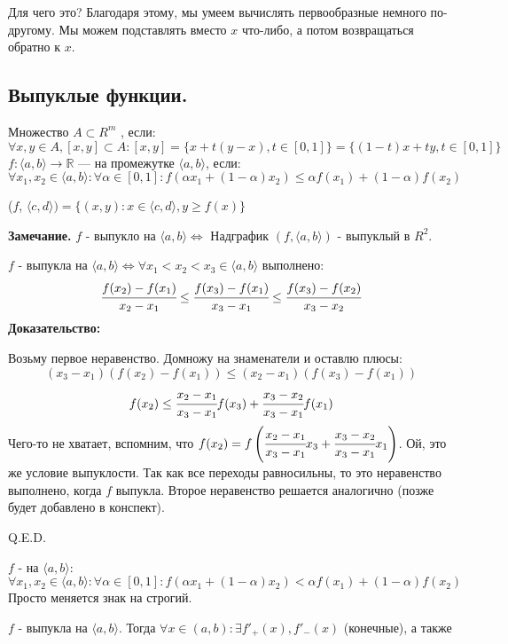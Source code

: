 Для чего это? Благодаря этому, мы умеем вычислять первообразные немного по-другому. Мы можем подставлять вместо $x$ что-либо, а потом возвращаться обратно к $x$.

\subsection{Выпуклые функции.}

Множество $A \subset R^m$ , если:
$$\forall x,y \in A , [x,y]\subset A: [x,y] = \{x+t(y-x), t\in[0,1]\} = \{(1-t)x + ty, t\in[0,1]\}$$
 $f:\langle a,b\rangle\rightarrow \mathbb{R}$ ---  на промежутке $\langle a,b\rangle$, если:
$$\forall x_1,x_2 \in \langle a,b \rangle: \forall \alpha \in[0,1]:f(\alpha x_1+(1-\alpha)x_2)\leq \alpha f(x_1) + (1-\alpha) f(x_2)$$

 ($f$, $\langle c,d \rangle) = \{(x,y): x\in \langle c,d \rangle, y \geq f(x)  \}$

\textbf{Замечание.} $f$ - выпукло на $\langle a,b\rangle \Leftrightarrow$ Надграфик $(f, \langle a,b \rangle)$ - выпуклый в $R^2$.


$f$ - выпукла на $\langle a,b\rangle \Leftrightarrow \forall x_1<x_2<x_3 \in\langle a,b \rangle$ выполнено:
$$\cfrac{f(x_2)-f(x_1)}{x_2-x_1} \leq \cfrac{f(x_3)-f(x_1)}{x_3-x_1}\leq \cfrac{f(x_3)-f(x_2)}{x_3-x_2}$$
\textbf{Доказательство:}

Возьму первое неравенство. Домножу на знаменатели и оставлю плюсы:
$$(x_3-x_1) (f(x_2)-f(x_1)) \leq (x_2-x_1) (f(x_3)-f(x_1))$$
$$f(x_2)\leq \cfrac{x_2-x_1}{x_3-x_1}f(x_3) + \cfrac{x_3-x_2}{x_3-x_1}f(x_1)$$
Чего-то не хватает, вспомним, что $f(x_2) = f\left (\cfrac{x_2-x_1}{x_3-x_1}x_3 +\cfrac{x_3-x_2}{x_3-x_1}x_1\right)$. Ой, это же условие выпуклости. Так как все переходы равносильны, то 
это неравенство выполнено, когда $f$ выпукла. Второе неравенство решается аналогично (позже будет добавлено в конспект).

\hfill Q.E.D.

$f$ -  на $\langle a,b\rangle$:
$$\forall x_1,x_2 \in \langle a,b \rangle: \forall \alpha \in[0,1]:f(\alpha x_1+(1-\alpha)x_2)< \alpha f(x_1) + (1-\alpha) f(x_2)$$
Просто меняется знак на строгий.


$f$ - выпукла на $\langle a,b \rangle$. Тогда $\forall x\in( a,b): \exists f'_+(x), f'_-(x)$ (конечные),  а также

